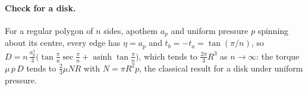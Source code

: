 \paragraph{Check for a disk.} For a regular polygon of $n$ sides, apothem $a_p$ and uniform
pressure $p$ spinning about its centre, every edge has $\eta = a_p$ and
$t_b = -t_a = \tan(\pi/n)$, so
$D = n\,\tfrac{a_p^3}{3}\bigl(\tan\tfrac{\pi}{n}\sec\tfrac{\pi}{n}
+ \operatorname{asinh}\tan\tfrac{\pi}{n}\bigr)$, which tends to $\tfrac{2\pi}{3}R^3$ as
$n\to\infty$: the torque $\mu\,p\,D$ tends to $\tfrac23\mu N R$ with $N = \pi R^2 p$, the
classical result for a disk under uniform pressure.
